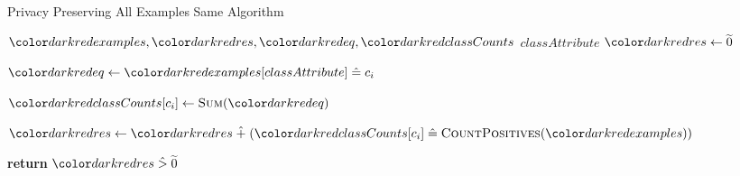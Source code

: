 \begin{algorithm}[H]
\caption{Privacy Preserving All Examples Same Algorithm}\label{a:id3-same-pp}
\begin{algorithmic}[1]
\renewcommand{\algorithmicrequire}{\textbf{Private Vars:}}
\Require $\red{examples}, \red{res}, \red{eq}, \red{classCounts}$
\renewcommand{\algorithmicrequire}{\textbf{Global Vars:}}
\Require $classAttribute$
    \State $\red{res} \gets  \enc{0}$


      \State $\red{eq} \gets \red{examples}[classAttribute] \heq c_i$ 

      \State $\red{classCounts}[c_i] \gets \textsc{Sum}(\red{eq})$

      \State $\red{res} \gets \red{res} \hplus (\red{classCounts}[c_i] \heq \textsc{CountPositives}(\red{examples}))$

    \EndFor

    \State \textbf{return} $\red{res} \hgt \enc{0}$
\EndProcedure
\end{algorithmic}
\end{algorithm}
